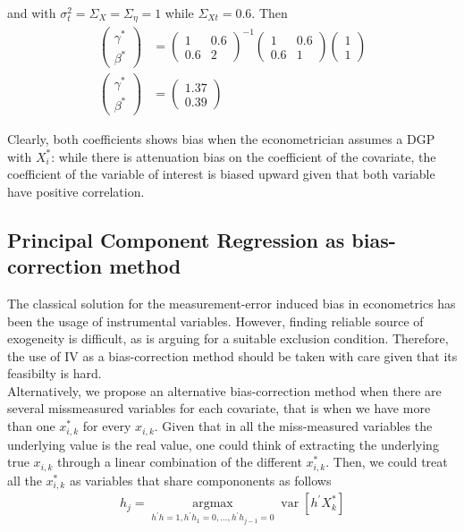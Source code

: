\documentclass[12pt]{article}
\begin{document}
and with $\sigma^2_t=\Sigma_X=\Sigma_\eta=1$ while $\Sigma_{Xt}=0.6$. Then
\begin{align*}
    \left(\begin{array}{l}
{\gamma}^* \\
{\beta}^*
\end{array}\right)& =\left(\begin{array}{cc}
1 & 0.6 \\
0.6 & 2
\end{array}\right)^{-1}\left(\begin{array}{cc}
1 & 0.6 \\
0.6 & 1
\end{array}\right)\left(\begin{array}{l}
1\\
1
\end{array}\right) \\
\left(\begin{array}{l}
{\gamma}^* \\
{\beta}^*
\end{array}\right)&=\left(\begin{array}{l}
1.37 \\
0.39
\end{array}\right)
\end{align*}

Clearly, both coefficients shows bias when the econometrician assumes a DGP with $X_i^*$: while there is attenuation bias on the coefficient of the covariate, the coefficient of the variable of interest is biased upward given that both variable have positive correlation.

\subsection*{Principal Component Regression as bias-correction method}

The classical solution for the measurement-error induced bias in econometrics has been the usage of instrumental variables. However, finding reliable source of exogeneity is difficult, as is arguing for a suitable exclusion condition. Therefore, the use of IV as a bias-correction method should be taken with care given that its feasibilty is hard.\\

Alternatively, we propose an alternative bias-correction method when there are several missmeasured variables for each covariate, that is when we have more than one $x_{i,k}^*$ for every $x_{i,k}$. Given that in all the miss-measured variables the underlying value is the real value, one could think of extracting the underlying true $x_{i,k}$ through a linear combination of the different $x_{i,k}^*$. Then, we could treat all the $x_{i,k}^*$ as variables that share compononents as follows
\begin{align}
   h_{j}=\underset{h^{\prime} h=1, h^{\prime} h_{1}=0, \ldots, h^{\prime} h_{j-1}=0}{\operatorname{argmax}} \operatorname{var}\left[h^{\prime} X^*_k\right]  
\end{align}
\end{document}
